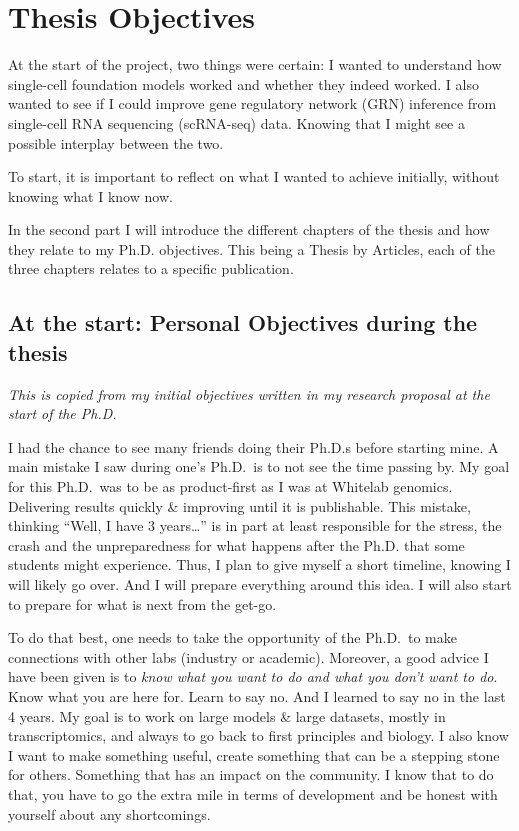 \chapter*{Thesis Objectives}

At the start of the project, two things were certain: I wanted to understand how single-cell foundation models worked and whether they indeed worked. I also wanted to see if I could improve gene regulatory network (\gls{GRN}) inference from single-cell RNA sequencing (\gls{scRNA-seq}) data. Knowing that I might see a possible interplay between the two.

To start, it is important to reflect on what I wanted to achieve initially, without knowing what I know now.

In the second part I will introduce the different chapters of the thesis and how they relate to my Ph.D. objectives. This being a Thesis by Articles, each of the three chapters relates to a specific publication. 

\section{At the start: Personal Objectives during the thesis}
\label{personal-objectives-during-the-thesis}

\textit{This is copied from my initial objectives written in my research proposal at the start of the Ph.D.}

I had the chance to see many friends doing their Ph.D.s before starting mine. A main mistake I saw during one's Ph.D.~is to not see the time passing by. My goal for this Ph.D.~was to be as product-first as I was at Whitelab genomics. Delivering results quickly \& improving until it is publishable. This mistake, thinking ``Well, I have 3 years\ldots'' is in part at least responsible for the stress, the crash and the unpreparedness for what happens after the Ph.D. that some students might experience. Thus, I plan to give myself a short timeline, knowing I will likely go over. And I will prepare everything around this idea. I will also start to prepare for what is next from the get-go.

To do that best, one needs to take the opportunity of the Ph.D.~to make connections with other labs (industry or academic). Moreover, a good advice I have been given is to \emph{know what you want to do and what you don't want to do}. Know what you are here for. Learn to say no. And I learned to say no in the last 4 years. My goal is to work on large models \& large datasets, mostly in transcriptomics, and always to go back to first principles and biology. I also know I want to make something useful, create something that can be a stepping stone for others. Something that has an impact on the community. I know that to do that, you have to go the extra mile in terms of development and be honest with yourself about any shortcomings.

